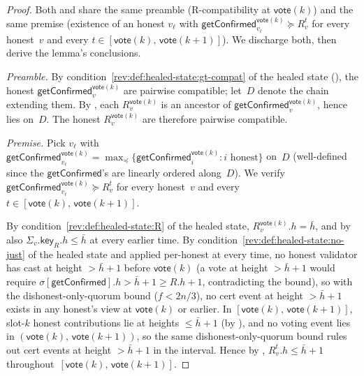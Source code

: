 \ifx\litemode\undefined\documentclass{article}\fi
\newcommand{\key}{\mathsf{key}}
\newcommand{\vote}{\mathsf{vote}}
\newcommand{\comm}[1]{\bar{#1}}
\newcommand{\getConfirmed}{\textsf{getConfirmed}\xspace}
\theoremstyle{plain}
\theoremstyle{definition}
\theoremstyle{remark}
\begin{document}
\begin{proof}
Both  and  share the same preamble (R-compatibility at $\vote(k)$) and the same premise (existence of an honest $v_\ell$ with $\getConfirmed_{v_\ell}^{\vote(k)} \succeq R_v^t$ for every honest~$v$ and every $t \in [\vote(k),\, \vote(k+1)]$). We discharge both, then derive the lemma's conclusions.

\emph{Preamble.}
By condition~\ref{rev:def:healed-state:gt-compat} of the healed state (), the honest $\getConfirmed_v^{\vote(k)}$ are pairwise compatible; let~$D$ denote the chain extending them. By , each $R_v^{\vote(k)}$ is an ancestor of $\getConfirmed_v^{\vote(k)}$, hence lies on~$D$. The honest $R_v^{\vote(k)}$ are therefore pairwise compatible.

\emph{Premise.}
Pick $v_\ell$ with $\getConfirmed_{v_\ell}^{\vote(k)} = \max_\preceq \{\getConfirmed_i^{\vote(k)} : i \text{ honest}\}$ on~$D$ (well-defined since the $\getConfirmed$'s are linearly ordered along~$D$). We verify $\getConfirmed_{v_\ell}^{\vote(k)} \succeq R_v^t$ for every honest~$v$ and every $t \in [\vote(k),\, \vote(k+1)]$.

By condition~\ref{rev:def:healed-state:R} of the healed state, $R_v^{\vote(k)}.h = \comm{h}$, and by  also $\Sigma_v.\key_R.h \leq \comm{h}$ at every earlier time. By condition~\ref{rev:def:healed-state:no-just} of the healed state and  applied per-honest at every time, no honest validator has cast at height $> \comm{h}+1$ before $\vote(k)$ (a vote at height $> \comm{h}+1$ would require $\sigma[\getConfirmed].h > \comm{h}+1 \geq R.h + 1$, contradicting the bound), so with the dishonest-only-quorum bound ($f < 2n/3$), no cert event at height $> \comm{h}+1$ exists in any honest's view at $\vote(k)$ or earlier. In $[\vote(k),\, \vote(k+1)]$, slot-$k$ honest contributions lie at heights $\leq \comm{h}+1$ (by ), and no voting event lies in $(\vote(k),\, \vote(k+1))$, so the same dishonest-only-quorum bound rules out cert events at height $> \comm{h}+1$ in the interval. Hence by , $R_v^t.h \leq \comm{h}+1$ throughout~$[\vote(k),\, \vote(k+1)]$.


\end{proof}
\end{document}
